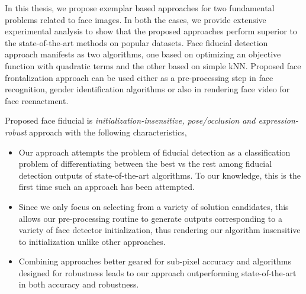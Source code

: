 % 


In this thesis, we propose exemplar based approaches for two fundamental problems
related to face images. In both the cases, we provide extensive experimental 
analysis to show that the proposed approaches perform superior to the 
state-of-the-art methods on popular datasets. Face fiducial detection approach 
manifests as two algorithms, one based on optimizing an objective function with 
quadratic terms and the other based on simple kNN. Proposed face frontalization
approach can be used either as a pre-processing step in face recognition, gender
identification algorithms or also in rendering face video for face reenactment.

Proposed face fiducial is \textit{initialization-insensitive, pose/occlusion and
expression-robust} approach with the following characteristics,
\begin{itemize}
\item{Our approach attempts the problem of fiducial detection 
as a classification problem of differentiating between 
the best vs the rest among fiducial detection outputs of 
state-of-the-art algorithms. To our knowledge, this is the 
first time such an approach has been attempted.}
\item{Since we only focus on selecting from a variety of solution 
candidates, this allows our pre-processing routine 
to generate outputs corresponding to a variety of face 
detector initialization, thus rendering our algorithm 
insensitive to initialization unlike other approaches.}
\item{Combining approaches better geared for sub-pixel accuracy 
and algorithms designed for robustness leads to our 
approach outperforming state-of-the-art in both accuracy 
and robustness.}
\end{itemize}


